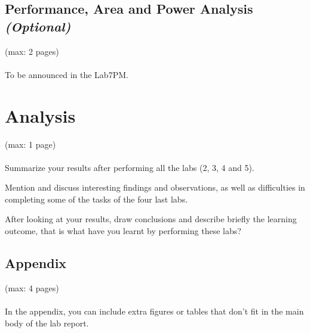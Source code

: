 \documentclass[a4paper,11pt]{article}
\begin{document}
\subsection{Performance, Area and Power Analysis \emph{(Optional)}}
(max: 2 pages)
\\\\
To be announced in the Lab7PM.

\section{Analysis}
(max: 1 page)
\\\\
Summarize your results after performing all the labs (2, 3, 4 and 5).

Mention and discuss interesting findings and observations, as well as difficulties in completing some of the tasks of the four last labs.

After looking at your results, draw conclusions and describe briefly the learning outcome, that is what have you learnt by performing these labs?  

\newpage
\begin{appendix}

\section{Appendix}
(max: 4 pages)
\\\\
In the appendix, you can include extra figures or tables that don't fit in the main body of the lab report. 

\end{appendix}
\end{document}
